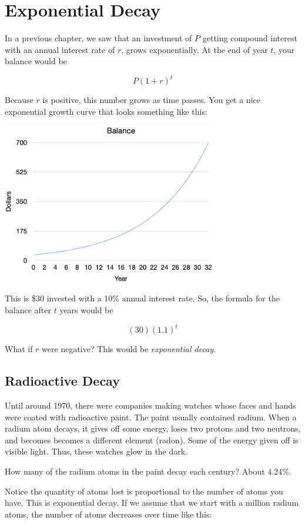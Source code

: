 \chapter{Exponential Decay}

In a previous chapter, we saw that an investment of $P$ getting
compound interest with an annual interest rate of $r$, grows
exponentially. At the end of year $t$, your balance would be

$$P\left(1 + r\right)^t$$

Because $r$ is positive, this number grows as time passes. You get a
nice exponential growth curve that looks something like this:

\includegraphics[width=0.7\textwidth]{exponential_growth.png}

This is \$30 invested with a 10\% annual interest rate. So, the formula
for the balance after $t$ years would be

$$(30)(1.1)^t$$

What if $r$ were negative? This would be \textit{exponential decay}.

\section{Radioactive Decay}

Until around 1970, there were companies making watches whose faces and
hands were coated with radioactive paint. The paint usually contained
radium. When a radium atom decays, it gives off some energy, loses two
protons and two neutrons, and becomes becomes a different element
(radon). Some of the energy given off is visible light. Thus, these
watches glow in the dark.

How many of the radium atoms in the paint decay each century? About 4.24\%.

Notice the quantity of atoms lost is proportional to the number of
atoms you have. This is exponential decay. If we assume that we start
with a million radium atoms, the number of atoms decreases over time like this:

